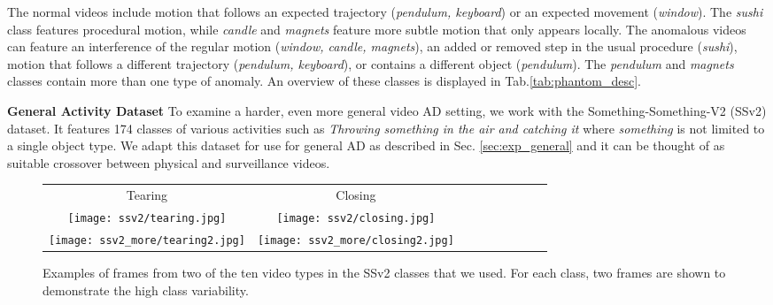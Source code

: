 \documentclass{article}
\begin{document}
The normal videos include motion that follows an expected trajectory (\textit{pendulum, keyboard}) or an expected movement (\textit{window}). The \textit{sushi} class features procedural motion, while \textit{candle} and \textit{magnets} feature more subtle motion that only appears locally. The anomalous videos can feature an interference of the regular motion (\textit{window, candle, magnets}), an added or removed step in the usual procedure (\textit{sushi}), motion that follows a different trajectory (\textit{pendulum, keyboard}),  or contains a different object (\textit{pendulum}). The \textit{pendulum} and \textit{magnets} classes contain more than one type of anomaly. An overview of these classes is displayed in Tab.\ref{tab:phantom_desc}. 


\textbf{General Activity Dataset}
\label{sec:ssv2}
To examine a harder, even more general video AD setting, we work with the Something-Something-V2 (SSv2) dataset. It features 174 classes of various activities such as \textit{Throwing something in the air and catching it} where \textit{something} is not limited to a single object type. We adapt this dataset for use for general AD as described in Sec. \ref{sec:exp_general} and it can be thought of as suitable crossover between physical and surveillance videos. 

\begin{figure}[t]
\begin{center}
\begin{tabular}{@{\hskip0pt}c@{\hskip5pt}c@{\hskip5pt}c@{\hskip5pt}c@{\hskip5pt}c@{\hskip5pt}c@{\hskip0pt}c@{\hskip0pt}c@{\hskip0pt}c}

Tearing & Closing\\

\texttt{[image: ssv2/tearing.jpg]} &
\texttt{[image: ssv2/closing.jpg]} \\
\texttt{[image: ssv2\_more/tearing2.jpg]} &
\texttt{[image: ssv2\_more/closing2.jpg]} \\

\end{tabular}
\end{center}
\caption{Examples of frames from two of the ten video types in the SSv2 classes that we used. For each class, two frames are shown to demonstrate the high class variability.}
\label{fig:ffhq}
\vspace{-1em}
\end{figure}
\end{document}
